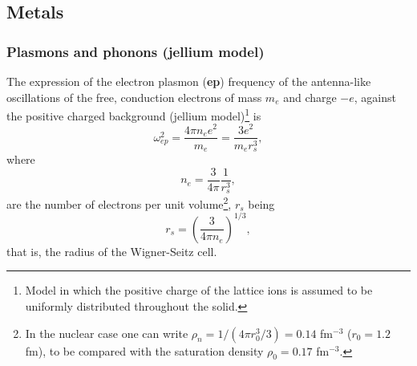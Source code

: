 \subsection{Metals}\label{App3A2}
\subsubsection{Plasmons and phonons (jellium model)}
The expression of the electron plasmon (\textbf{ep}) frequency of the antenna-like oscillations of the free, conduction electrons of mass $m_e$ and charge $-e$, against the positive charged background (jellium model)\footnote{Model in which the positive charge of the lattice ions is assumed to be uniformly distributed throughout the solid.} is
\begin{equation}\label{eq3.A.33}
\omega_{ep}^2=\frac{4\pi n_e e^2}{m_e}=\frac{3e^2}{m_er_s^3},
\end{equation}
where 
\begin{equation}
n_e=\frac{3}{4\pi}\frac{1}{r_s^3},
\end{equation}
are the number of electrons per unit volume\footnote{In the nuclear case one can write $\rho_n=1/(4\pi r_0^3/3)=0.14$ fm$^{-3}$ ($r_0=1.2$ fm), to be compared with the saturation density $\rho_0=0.17$ fm$^{-3}$.}, $r_s$ being
\begin{equation}
r_s=\left(\frac{3}{4\pi n_e}\right)^{1/3},
\end{equation}
that is, the radius of the Wigner-Seitz cell.


